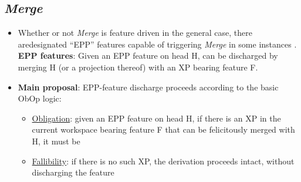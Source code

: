 \documentclass[letterpaper,10pt]{handout_nick}
\begin{document}
\subsection{\emph{Merge}}
\begin{itemize}
\item Whether or not \emph{Merge} is feature driven in the general case, there aredesignated ``EPP'' features capable of triggering \emph{Merge} in some instances 
\ex. \textbf{EPP features}: Given an EPP feature  on head H,  can be discharged by merging H (or a projection thereof) with an XP bearing feature F. 

\item \textbf{Main proposal}: EPP-feature discharge proceeds according to the basic ObOp logic: 
\begin{itemize}
\item \underline{Obligation}: given an EPP feature  on head H, if there is an XP in the current workspace bearing feature F that can be felicitously merged with H, it must be
\item \underline{Fallibility}: if there is no such XP, the derivation proceeds intact, without discharging the feature
\end{itemize}


\end{itemize}
\end{document}
